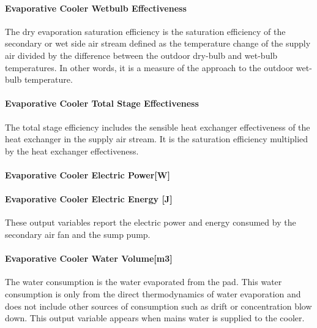 \paragraph{Evaporative Cooler Wetbulb Effectiveness}\label{evaporative-cooler-wetbulb-effectiveness}

The dry evaporation saturation efficiency is the saturation efficiency of the secondary or wet side air stream defined as the temperature change of the supply air divided by the difference between the outdoor dry-bulb and wet-bulb temperatures. In other words, it is a measure of the approach to the outdoor wet-bulb temperature.

\paragraph{Evaporative Cooler Total Stage Effectiveness}\label{evaporative-cooler-total-stage-effectiveness}

The total stage efficiency includes the sensible heat exchanger effectiveness of the heat exchanger in the supply air stream. It is the saturation efficiency multiplied by the heat exchanger effectiveness.

\paragraph{Evaporative Cooler Electric Power{[}W{]}}\label{evaporative-cooler-electric-powerw-2}

\paragraph{Evaporative Cooler Electric Energy {[}J{]}}\label{evaporative-cooler-electric-energy-j-2}

These output variables report the electric power and energy consumed by the secondary air fan and the sump pump.

\paragraph{Evaporative Cooler Water Volume{[}m3{]}}\label{evaporative-cooler-water-volumem3}

The water consumption is the water evaporated from the pad. This water consumption is only from the direct thermodynamics of water evaporation and does not include other sources of consumption such as drift or concentration blow down. This output variable appears when mains water is supplied to the cooler.

